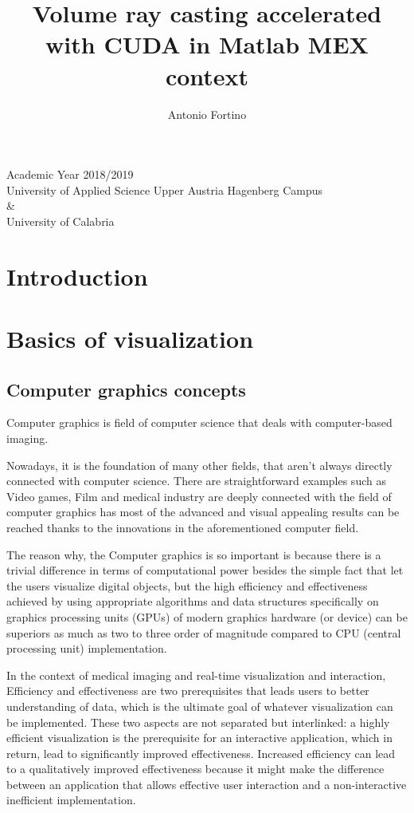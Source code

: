 \documentclass[12pt,a4paper]{extarticle}
\author{Antonio Fortino}
\title{Volume ray casting accelerated with CUDA in Matlab MEX context}
\newcommand{\linespace}{\vspace{8pt}}
\begin{document}
\maketitle
\begin{center}
Academic Year 2018/2019\\
University of Applied Science Upper Austria Hagenberg Campus\\
\&\\
University of Calabria
\end{center}
\pagebreak
{}
\fancyhf{}
\fancyhead[R]{\thepage}
\tableofcontents
\pagebreak

\section*{Introduction} 
\pagebreak
\fancyhead[L]{\nouppercase{\leftmark}}
\section{Basics of visualization}
\subsection{Computer graphics concepts} 
Computer graphics is field of computer science that deals with computer-based imaging.

Nowadays, it is the foundation of many other fields, that aren't always directly connected with computer science. There are straightforward examples such as Video games, Film and medical industry are deeply connected with the field of computer graphics has most of the advanced and visual appealing results can be reached thanks to the innovations in the aforementioned computer field.

The reason why, the Computer graphics is so important is because there is a trivial difference in terms of computational power besides the simple fact that let the users visualize digital objects, but the high efficiency and effectiveness achieved by using appropriate algorithms and data structures specifically on graphics processing units (GPUs) of modern graphics hardware (or device) can be superiors as much as two to three order of magnitude compared to CPU (central processing unit) implementation.
\linespace

In the context of medical imaging and real-time visualization and interaction, Efficiency and effectiveness are two prerequisites that leads users to better understanding of data, which is the ultimate goal of whatever visualization can be implemented.
These two aspects are not separated but interlinked: a highly efficient visualization is the prerequisite for an interactive application, which in return, lead to significantly improved effectiveness.
\cite{weiskopf_2006:1} %
Increased efficiency can lead to a qualitatively improved effectiveness because it might make the difference between an application that allows effective user interaction and a non-interactive inefficient implementation.
\linespace
\end{document}
